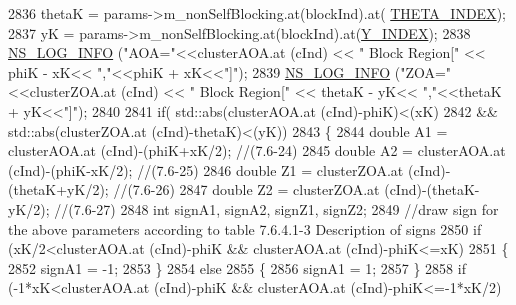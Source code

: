 \begin{DoxyCode}
2836                         thetaK = params->m\_nonSelfBlocking.at(blockInd).at(
      \hyperlink{mmwave-3gpp-channel_8h_a5d773c28fd925701ed291c2401cddff0}{THETA\_INDEX});
2837                         yK = params->m\_nonSelfBlocking.at(blockInd).at(\hyperlink{mmwave-3gpp-channel_8h_a061187b89198cb94cc331d5a76476bc1}{Y\_INDEX});
2838                         \hyperlink{group__logging_gafbd73ee2cf9f26b319f49086d8e860fb}{NS\_LOG\_INFO} (\textcolor{stringliteral}{"AOA="}<<clusterAOA.at (cInd) << \textcolor{stringliteral}{" Block Region["} << phiK - 
      xK<< \textcolor{stringliteral}{","}<<phiK + xK<<\textcolor{stringliteral}{"]"});
2839                         \hyperlink{group__logging_gafbd73ee2cf9f26b319f49086d8e860fb}{NS\_LOG\_INFO} (\textcolor{stringliteral}{"ZOA="}<<clusterZOA.at (cInd) << \textcolor{stringliteral}{" Block Region["} << thetaK 
      - yK<< \textcolor{stringliteral}{","}<<thetaK + yK<<\textcolor{stringliteral}{"]"});
2840 
2841                         \textcolor{keywordflow}{if}( std::abs(clusterAOA.at (cInd)-phiK)<(xK)
2842                                         && std::abs(clusterZOA.at (cInd)-thetaK)<(yK))
2843                         \{
2844                                 \textcolor{keywordtype}{double} A1 = clusterAOA.at (cInd)-(phiK+xK/2); \textcolor{comment}{//(7.6-24)}
2845                                 \textcolor{keywordtype}{double} A2 = clusterAOA.at (cInd)-(phiK-xK/2); \textcolor{comment}{//(7.6-25)}
2846                                 \textcolor{keywordtype}{double} Z1 = clusterZOA.at (cInd)-(thetaK+yK/2); \textcolor{comment}{//(7.6-26)}
2847                                 \textcolor{keywordtype}{double} Z2 = clusterZOA.at (cInd)-(thetaK-yK/2); \textcolor{comment}{//(7.6-27)}
2848                                 \textcolor{keywordtype}{int} signA1, signA2, signZ1, signZ2;
2849                                 \textcolor{comment}{//draw sign for the above parameters according to table 7.6.4.1-3
       Description of signs}
2850                                 \textcolor{keywordflow}{if} (xK/2<clusterAOA.at (cInd)-phiK && clusterAOA.at (cInd)-phiK<=xK)
2851                                 \{
2852                                         signA1 = -1;
2853                                 \}
2854                                 \textcolor{keywordflow}{else}
2855                                 \{
2856                                         signA1 = 1;
2857                                 \}
2858                                 \textcolor{keywordflow}{if} (-1*xK<clusterAOA.at (cInd)-phiK && clusterAOA.at (cInd)-phiK<=-1*xK/2)

\end{DoxyCode}
